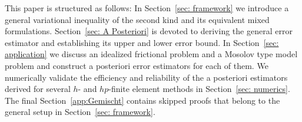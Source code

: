 \documentclass[12pt,twoside,reqno]{amsart}
\theoremstyle{definition}
\numberwithin{equation}{section}
\begin{document}
This paper is structured as follows: In Section~\ref{sec: framework} we introduce a general variational inequality of the second kind and its equivalent mixed formulations. Section~\ref{sec: A Posteriori} is devoted to deriving the general error estimator and establishing its upper and lower error bound. In Section~\ref{sec: application} we discuss an idealized frictional problem and a Mosolov type model problem and construct a posteriori error estimators for each of them. We numerically validate the efficiency and reliability of the a posteriori estimators derived for several $h$- and $hp$-finite element methods in Section~\ref{sec: numerics}. The final Section~\ref{app:Gemischt} contains skipped proofs that belong to the general setup in Section~\ref{sec: framework}.


\end{document}
